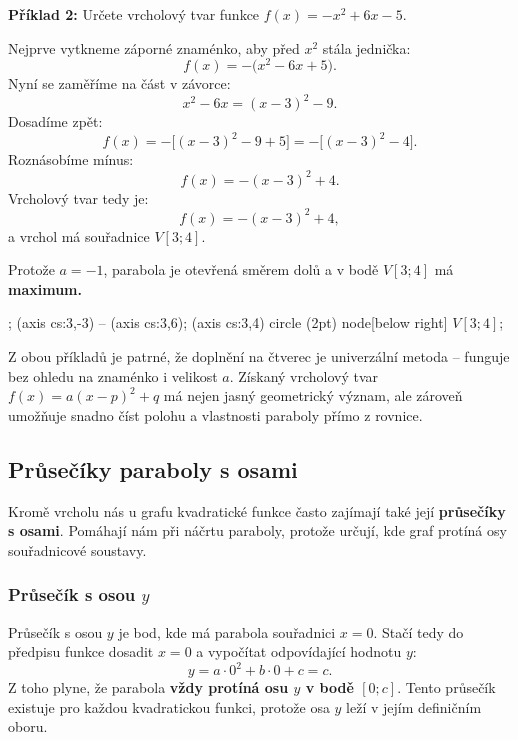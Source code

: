 \documentclass[12pt,a4paper]{article}
\begin{document}
\begin{examplebox}
\textbf{Příklad 2:}  
Určete vrcholový tvar funkce \(f(x) = -x^2 + 6x - 5.\)

\medskip
Nejprve vytkneme záporné znaménko, aby před \(x^2\) stála jednička:
\[
f(x) = -\big(x^2 - 6x + 5\big).
\]
Nyní se zaměříme na část v závorce:
\[
x^2 - 6x = (x - 3)^2 - 9.
\]
Dosadíme zpět:
\[
f(x) = -\big[(x - 3)^2 - 9 + 5\big] = -\big[(x - 3)^2 - 4\big].
\]
Roznásobíme mínus:
\[
f(x) = -(x - 3)^2 + 4.
\]
Vrcholový tvar tedy je:
\[
f(x) = -(x - 3)^2 + 4,
\]
a vrchol má souřadnice \(V[3; 4].\)

\medskip
Protože \(a = -1\), parabola je otevřená směrem dolů a v bodě \(V[3; 4]\) má \textbf{maximum.}
\end{examplebox}

\begin{center}
\begin{axisgraph}[
  xmin=-1, xmax=6,
  ymin=-2, ymax=6,
  samples=200,
  width=9cm,
  height=6cm,
  title={$y = -x^2 + 6x - 5 = -(x - 3)^2 + 4$}
]
  ;
   (axis cs:3,-3) -- (axis cs:3,6);
   (axis cs:3,4) circle (2pt) node[below right] {$V[3;4]$};
\end{axisgraph}
\end{center}

\medskip
Z obou příkladů je patrné, že doplnění na čtverec je univerzální metoda – funguje bez ohledu na znaménko i velikost \(a\).  
Získaný vrcholový tvar \(f(x) = a(x - p)^2 + q\) má nejen jasný geometrický význam, ale zároveň umožňuje snadno číst polohu a vlastnosti paraboly přímo z rovnice.


\subsection{Průsečíky paraboly s osami}

Kromě vrcholu nás u grafu kvadratické funkce často zajímají také její \textbf{průsečíky s osami}.  
Pomáhají nám při náčrtu paraboly, protože určují, kde graf protíná osy souřadnicové soustavy.

\subsubsection*{Průsečík s osou \(y\)}

Průsečík s osou \(y\) je bod, kde má parabola souřadnici \(x = 0\).  
Stačí tedy do předpisu funkce dosadit \(x = 0\) a vypočítat odpovídající hodnotu \(y\):
\[
y = a \cdot 0^2 + b \cdot 0 + c = c.
\]
Z toho plyne, že parabola \textbf{vždy protíná osu \(y\) v bodě \([0; c]\)}.  
Tento průsečík existuje pro každou kvadratickou funkci, protože osa \(y\) leží v jejím definičním oboru.
\end{document}
